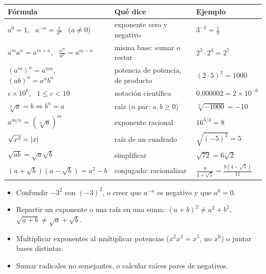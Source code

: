 \documentclass[11pt,a4paper]{article}
\begin{document}
\repaso
\begin{center}\small
\begin{tabularx}{\linewidth}{@{}>{\centering\arraybackslash}p{48mm} L >{\raggedright\arraybackslash}p{46mm}@{}}
\toprule
Fórmula & Qué dice & Ejemplo\\ \midrule
$a^{0}=1$, \ $a^{-n}=\tfrac1{a^{n}}$ \ ($a\neq0$) & exponente cero y negativo & $3^{-2}=\tfrac19$\\
$a^{m}a^{n}=a^{m+n}$, \ $\tfrac{a^{m}}{a^{n}}=a^{m-n}$ & misma base: sumar o restar & $2^3\cdot2^4=2^7$\\
$(a^{m})^{n}=a^{mn}$, \ $(ab)^{n}=a^{n}b^{n}$ & potencia de potencia, de producto & $(2\cdot5)^3=1000$\\
$c\times10^{k}$, \ $1\le c<10$ & notación científica & $0.000002=2\times10^{-6}$\\
$\sqrt[n]{a}=b\iff b^{n}=a$ & raíz ($n$ par: $a,b\ge0$) & $\sqrt[3]{-1000}=-10$\\
$a^{m/n}=(\sqrt[n]{a})^{m}$ & exponente racional & $16^{3/4}=8$\\
$\sqrt{x^{2}}=\left\lvert x\right\rvert$ & raíz de un cuadrado & $\sqrt{(-5)^2}=5$\\
$\sqrt{ab}=\sqrt a\sqrt b$ & simplificar & $\sqrt{72}=6\sqrt2$\\
$(a+\sqrt b)(a-\sqrt b)=a^2-b$ & conjugado: racionalizar & $\tfrac9{4+\sqrt5}=\tfrac{9(4-\sqrt5)}{11}$\\
\bottomrule
\end{tabularx}
\end{center}
\begin{ojo}
\begin{itemize}
\item Confundir $-3^{2}$ con $(-3)^{2}$, o creer que $a^{-n}$ es negativo y que $a^{0}=0$.
\item Repartir un exponente o una raíz en una suma: $(a+b)^{2}\neq a^{2}+b^{2}$, \ $\sqrt{a+b}\neq\sqrt a+\sqrt b$.
\item Multiplicar exponentes al multiplicar potencias ($x^{2}x^{3}=x^{5}$, no $x^{6}$) o juntar bases distintas.
\item Sumar radicales no semejantes, o calcular raíces pares de negativos.
\end{itemize}
\end{ojo}
\end{document}
